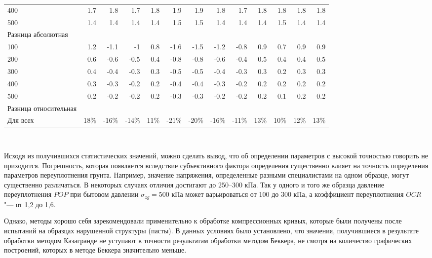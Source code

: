 \begin{sidewaystable}[p]
\begin{tabular}{@{}lrrrrrrrrrrrr@{}}
    400 & 1.7 & 1.8 & 1.7 & 1.8 & 1.9 & 1.9 & 1.8 & 1.7 & 1.8 & 1.8 & 1.8 & 1.8 \\
    500 & 1.4 & 1.4 & 1.4 & 1.4 & 1.5 & 1.5 & 1.4 & 1.4 & 1.4 & 1.5 & 1.4 & 1.4 \\
    \midrule
    Разница абсолютная &  &  &  &  &  &  &  &  &  &  &  &  \\
    100 & 1.2 & -1.1 & -1 & 0.8 & -1.6 & -1.5 & -1.2 & -0.8 & 0.9 & 0.7 & 0.9 & 0.9 \\
    200 & 0.6 & -0.6 & -0.5 & 0.4 & -0.8 & -0.8 & -0.6 & -0.4 & 0.5 & 0.4 & 0.4 & 0.5 \\
    300 & 0.4 & -0.4 & -0.3 & 0.3 & -0.5 & -0.5 & -0.4 & -0.3 & 0.3 & 0.2 & 0.3 & 0.3 \\
    400 & 0.3 & -0.3 & -0.2 & 0.2 & -0.4 & -0.4 & -0.3 & -0.2 & 0.2 & 0.2 & 0.2 & 0.2 \\
    500 & 0.2 & -0.2 & -0.2 & 0.2 & -0.3 & -0.3 & -0.2 & -0.2 & 0.2 & 0.1 & 0.2 & 0.2 \\
    \midrule
    Разница относительная &  &  &  &  &  &  &  &  &  &  &  &  \\
    Для всех & 18\% & -16\% & -14\% & 11\% & -21\% & -20\% & -16\% & -11\% & 13\% & 10\% & 12\% & 13\% \\
    \bottomrule
    \end{tabular}
    \\ 
\end{sidewaystable}



Исходя из получившихся статистических значений, можно сделать вывод, что об определении параметров с высокой точностью говорить не приходится. Погрешность, которая появляется вследствие субъективного фактора определения существенно влияет на точность определения параметров переуплотнения грунта.
Например, значение напряжения, определенные разными специалистами на одном образце, могут существенно различаться. В некоторых случаях отличия достигают до 250--300 кПа. Так у одного и того же образца давление переуплотнения $POP$ при бытовом давлении $\sigma_{zg} = 500$ кПа может варьироваться от 100 до 300 кПа, а коэффициент переуплотнения $OCR$ "--- от 1,2 до 1,6.

Однако, методы хорошо себя зарекомендовали применительно к обработке компрессионных кривых, которые были получены после испытаний на образцах нарушенной структуры (пасты). В данных условиях было установлено, что значения, получившиеся в результате обработки методом Казагранде не уступают в точности результатам обработки методом Беккера, не смотря на количество графических построений, которых в методе Беккера значительно меньше. 

